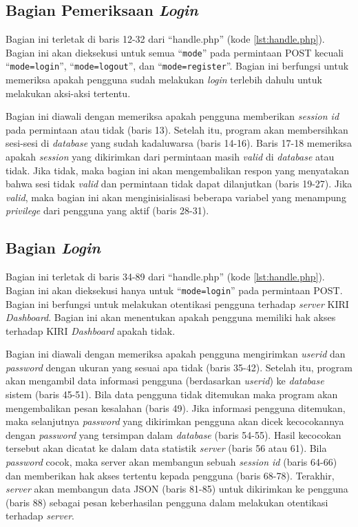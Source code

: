 \subsection{Bagian Pemeriksaan \textit{Login}}
\label{sec:pemeriksaanlogin}
Bagian ini terletak di baris 12-32 dari ``handle.php'' (kode \ref{lst:handle.php}). Bagian ini akan dieksekusi untuk semua ``\texttt{mode}'' pada permintaan POST kecuali ``\texttt{mode=login}'', ``\texttt{mode=logout}'', dan ``\texttt{mode=register}''. Bagian ini berfungsi untuk memeriksa apakah pengguna sudah melakukan \textit{login} terlebih dahulu untuk melakukan aksi-aksi tertentu.

Bagian ini diawali dengan memeriksa apakah pengguna memberikan \textit{session id} pada permintaan atau tidak (baris 13). Setelah itu, program akan membersihkan sesi-sesi di \textit{database} yang sudah kadaluwarsa (baris 14-16). Baris 17-18 memeriksa apakah \textit{session} yang dikirimkan dari permintaan masih \textit{valid} di \textit{database} atau tidak. Jika tidak, maka bagian ini akan mengembalikan respon yang menyatakan bahwa sesi tidak \textit{valid} dan permintaan tidak dapat dilanjutkan (baris 19-27). Jika \textit{valid}, maka bagian ini akan menginisialisasi beberapa variabel yang menampung \textit{privilege} dari pengguna yang aktif (baris 28-31).

\subsection{Bagian \textit{Login}}
\label{sec:bagianlogin}
Bagian ini terletak di baris 34-89 dari ``handle.php'' (kode \ref{lst:handle.php}). Bagian ini akan dieksekusi hanya untuk ``\texttt{mode=login}'' pada permintaan POST. Bagian ini berfungsi untuk melakukan otentikasi pengguna terhadap \textit{server} KIRI \textit{Dashboard}. Bagian ini akan menentukan apakah pengguna memiliki hak akses terhadap KIRI \textit{Dashboard} apakah tidak.

Bagian ini diawali dengan memeriksa apakah pengguna mengirimkan \textit{userid} dan \textit{password} dengan ukuran yang sesuai apa tidak (baris 35-42). Setelah itu, program akan mengambil data informasi pengguna (berdasarkan \textit{userid}) ke \textit{database} sistem (baris 45-51). Bila data pengguna tidak ditemukan maka program akan mengembalikan pesan kesalahan (baris 49). Jika informasi pengguna ditemukan, maka selanjutnya \textit{password} yang dikirimkan pengguna akan dicek kecocokannya dengan \textit{password} yang tersimpan dalam \textit{database} (baris 54-55). Hasil kecocokan tersebut akan dicatat ke dalam data statistik \textit{server} (baris 56 atau 61). Bila \textit{password} cocok, maka server akan membangun sebuah \textit{session id} (baris 64-66) dan memberikan hak akses tertentu kepada pengguna (baris 68-78). Terakhir, \textit{server} akan membangun data JSON (baris 81-85) untuk dikirimkan ke pengguna (baris 88) sebagai pesan keberhasilan pengguna dalam melakukan otentikasi terhadap \textit{server}.


